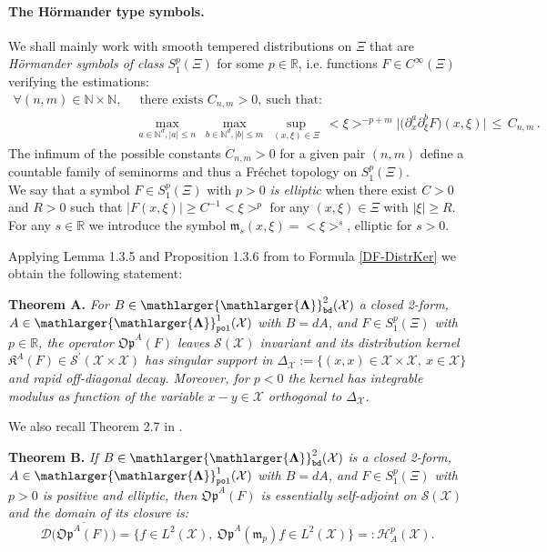 \documentclass[12pt]{article}
\theoremstyle{definition}
\def\R{\mathbb{R}}
\def\Op{\mathfrak{Op}}
\def\X{\mathcal X}
\def\beq{\begin{equation}}
\def\eeq{\end{equation}}
\def\Fb{\mathlarger{\mathlarger{\mathbf{\Lambda}}}_{\text{\tt bd}}}
\def\Fp{\mathlarger{\mathlarger{\mathbf{\Lambda}}}_{\text{\tt pol}}}
\numberwithin{equation}{section}
\begin{document}
\paragraph{The H\"{o}rmander type symbols.} We shall mainly work with smooth tempered distributions on $\Xi$ that are \textit{H\"{o}rmander symbols of class} $S^p_1(\Xi)$ for some $p\in\R$, i.e. functions $F\in{C}^\infty(\Xi)$ verifying the estimations:
\beq\begin{split}
	\forall(n,m)\in\mathbb{N}\times\mathbb{N},\ &\text{ there exists } C_{n,m}>0,\ \text{such that:}\\
	&\underset{a\in\mathbb{N}^d,|a|\leq{n}}{\max}\ \underset{b\in\mathbb{N}^d,|b|\leq{m}}{\max}\ \underset{(x,\xi)\in\Xi}{\sup}\ <\xi>^{-p+m}\big|\big(\partial_x^a\partial_{\xi}^bF\big)(x,\xi)\big|\,\leq\,C_{n,m}\,.
\end{split}\eeq
The infimum of the possible constants $C_{n,m}>0$ for a given pair $(n,m)$ define a countable family of seminorms and thus a Fr\'{e}chet topology on $S^p_1(\Xi)$. \\
We say that a symbol $F\in{S}^p_1(\Xi)$ with $p>0$ \textit{is elliptic} when there exist $C>0$ and $R>0$ such that $\big|F(x,\xi)\big|\geq{C^{-1}}<\xi>^p$ for any $(x,\xi)\in\Xi$ with $|\xi|\geq{R}$. \\
For any $s\in\R$ we introduce the symbol $\mathfrak{m}_s(x,\xi)=<\xi>^s$, elliptic for $s>0$.

Applying Lemma 1.3.5 and Proposition 1.3.6 from \cite{ABG} to Formula \eqref{DF-DistrKer} we obtain the following statement:

\noindent\textbf{Theorem A.} \textit{For $B\in\Fb^2(\X)$ a closed 2-form, $A\in\Fp^1(\X)$ with $B=dA$, and  $F\in{S}^p_1(\Xi)$ with  $p\in\R$,  the operator $\Op^A(F)$ 
 leaves $\mathscr{S}(\X)$ invariant and its distribution kernel $\mathfrak{K}^A(F)\in\mathscr{S}^\prime(\X\times\X)$ has singular support in $\Delta_\X:=\{(x,x)\in\X\times\X,\ x\in\X\}$ and rapid off-diagonal decay. Moreover, for $p<0$ the kernel has integrable modulus as function of the variable $x-y\in\X$ orthogonal to $\Delta_{\X}$.}

We also recall Theorem 2.7 in \cite{IMP-3}.

\noindent\textbf{Theorem B.} \textit{If $B\in\Fb^2(\X)$ is a closed 2-form, $A\in\Fp^1(\X)$ with $B=dA$, and  $F\in{S}^p_1(\Xi)$ with $p>0$ is positive and elliptic, then $\Op^A(F)$ is essentially self-adjoint on $\mathscr{S}(\X)$  and the domain of its  closure is:
\beq
\mathcal{D}\big(\overline{\Op^A(F)}\big)=\big\{f\in{L}^2(\X),\ \Op^A(\mathfrak{m}_p)f\in{L}^2(\X)\big\}=:\mathscr{H}^p_A(\X).
\eeq}
\end{document}
